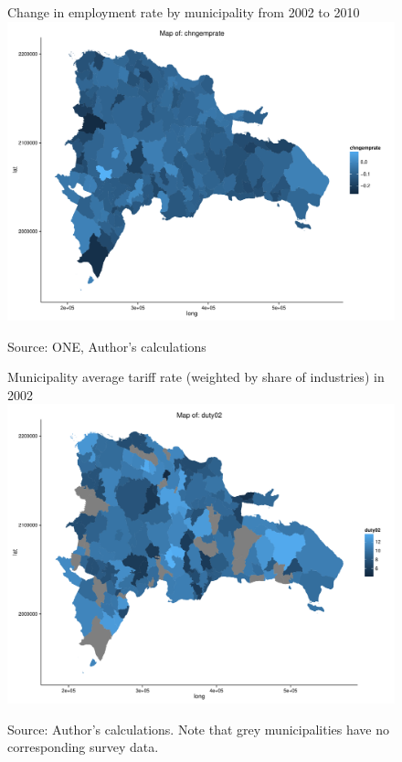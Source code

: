 \begin{landscape}
\begin{figure}[H]
\centering
Change in employment rate by municipality from 2002 to 2010
\includegraphics[height=\vsize,keepaspectratio=true]{../Maps/drchngemprate.pdf}
\caption{\label{fig:Map6}}
Source: ONE, Author's calculations
\end{figure}

\begin{figure}[H]
\centering
Municipality average tariff rate (weighted by share of industries) in 2002
\includegraphics[height=\vsize,keepaspectratio=true]{../Maps/drduty02.pdf}
\caption{\label{fig:Map1}}
Source: Author's calculations. Note that grey municipalities have no corresponding survey data.
\end{figure}


\end{landscape}
